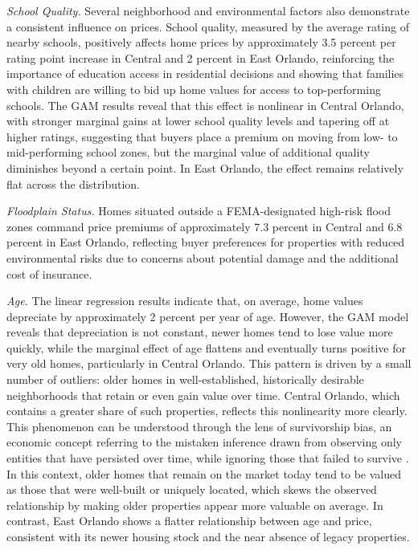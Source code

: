 \textit{School Quality.}
Several neighborhood and environmental factors also demonstrate a consistent influence on prices. School quality, measured by the average rating of nearby schools, positively affects home prices by approximately 3.5 percent  per rating point increase in Central and 2 percent in East Orlando, reinforcing the importance of education access in residential decisions and showing that families with children are willing to bid up home values for access to top-performing schools. The GAM results reveal that this effect is nonlinear in Central Orlando, with stronger marginal gains at lower school quality levels and tapering off at higher ratings, suggesting that buyers place a premium on moving from low- to mid-performing school zones, but the marginal value of additional quality diminishes beyond a certain point. In East Orlando, the effect remains relatively flat across the distribution.

\textit{Floodplain Status.}
Homes situated outside a FEMA-designated high-risk flood zones command price premiums of approximately 7.3 percent in Central and 6.8 percent in East Orlando, reflecting buyer preferences for properties with reduced environmental risks due to concerns about potential damage and the additional cost of insurance. 

\textit{Age.}
The linear regression results indicate that, on average, home values depreciate by approximately 2 percent  per year of age. However, the GAM model reveals that depreciation is not constant, newer homes tend to lose value more quickly, while the marginal effect of age flattens and eventually turns positive for very old homes, particularly in Central Orlando. This pattern is driven by a small number of outliers: older homes in well-established, historically desirable neighborhoods that retain or even gain value over time. Central Orlando, which contains a greater share of such properties, reflects this nonlinearity more clearly. This phenomenon can be understood through the lens of survivorship bias, an economic concept referring to the mistaken inference drawn from observing only entities that have persisted over time, while ignoring those that failed to survive \citep{brownEtAl:1992}. In this context, older homes that remain on the market today tend to be valued as those that were well-built or uniquely located, which skews the observed relationship by making older properties appear more valuable on average.  In contrast, East Orlando shows a flatter relationship between age and price, consistent with its newer housing stock and the near absence of legacy properties.

